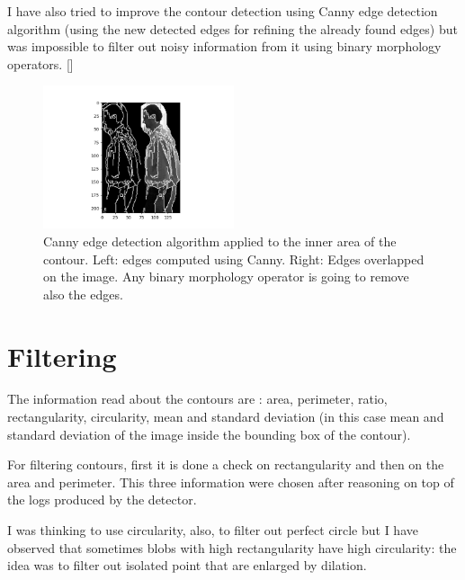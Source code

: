 \documentclass{article}
\newcommand{\CREF}[1]{[\hyperref[#1]{\Cref{#1}}]}
\begin{document}
I have also tried to improve the contour detection using Canny edge detection algorithm (using the new detected edges for refining the already found edges) but was impossible to filter out noisy information from it using binary morphology operators. \CREF{canny}

\begin{figure}
    \centering
    \includegraphics[width=0.5\textwidth,keepaspectratio]{canny.png}
    \caption{Canny edge detection algorithm applied to the inner area of the contour. Left: edges computed using Canny. Right: Edges overlapped on the image. Any binary morphology operator is going to remove also the edges.}
    \label{canny}
\end{figure}

\section{Filtering}
The information read about the contours are : area, perimeter, ratio, rectangularity, circularity, mean and standard deviation (in this case mean and standard deviation of the image inside the bounding box of the contour).



For filtering contours, first it is done a check on rectangularity and then on the area and perimeter.
This three information were chosen after reasoning on top of the logs produced by the detector.

I was thinking to use circularity, also, to filter out perfect circle but I have observed that sometimes blobs with high rectangularity have high circularity: the idea was to filter out isolated point that are enlarged by dilation.

\clearpage
\end{document}
